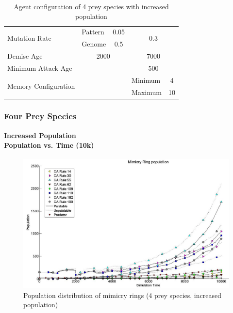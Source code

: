 {\begin{table}[H]
\begin{tiny}
\begin{spacing}{1.5}
\begin{tabular}{|l|l|c|c|l|c|}
	  \multirow{2}{*}{Mutation Rate} & Pattern   & \multicolumn{2}{|c|}{0.05} & \multicolumn{2}{|c|}{\multirow{2}{*}{0.3}} \\ \cline{2-4}
	  						 									 & Genome    & \multicolumn{2}{|c|}{0.5}  & \multicolumn{2}{|c|}{} \\ \hline
	  Demise Age	 									 & \multicolumn{3}{|c|}{2000}							& \multicolumn{2}{|c|}{7000} \\ \hline
	  Minimum Attack Age						 & \multicolumn{3}{|c|}{} 						    & \multicolumn{2}{|c|}{500} \\ \hline
	  \multirow{2}{*}{Memory Configuration} & \multicolumn{3}{|c|}{} 					& Minimum & 4 \\ \cline{5-6}
	   																			& \multicolumn{3}{|c|}{} 					& Maximum & 10 \\ \hline  
	\end{tabular}
	\end{spacing}	
	\end{tiny}
	\caption{Agent configuration of 4 prey species with increased population}
	\label{tab:config-table-4-more-prey}
	\end{table}

}

\frame
{
	\frametitle{Four Prey Species}
	\framesubtitle{Increased Population\\ Population vs. Time (10k)}

	\begin{figure}[H]
		\centering
		\includegraphics[scale=0.25]{../tex/images/simTime10K-4MorePrey}
		\caption{Population distribution of mimicry rings (4 prey species, increased population)}
		\label{fig:plot-4-more-prey}
	\end{figure}	
}


